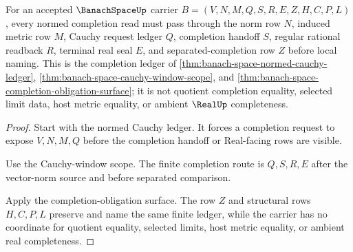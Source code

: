 \begin{theorem}
\label{thm:banach-space-norm-completion-ledger-obligation}
For an accepted $\BanachSpaceUp$ carrier $B=(V,N,M,Q,S,R,E,Z,H,C,P,L)$, every normed completion read must pass through the norm row $N$, induced metric row $M$, Cauchy request ledger $Q$, completion handoff $S$, regular rational readback $R$, terminal real seal $E$, and separated-completion row $Z$ before local naming. This is the completion ledger of \autoref{thm:banach-space-normed-cauchy-ledger}, \autoref{thm:banach-space-cauchy-window-scope}, and \autoref{thm:banach-space-completion-obligation-surface}; it is not quotient completion equality, selected limit data, host metric equality, or ambient $\RealUp$ completeness.
\end{theorem}
\begin{proof}
Start with the normed Cauchy ledger. It forces a completion request to expose $V,N,M,Q$ before the completion handoff or Real-facing rows are visible.

Use the Cauchy-window scope. The finite completion route is $Q,S,R,E$ after the vector-norm source and before separated comparison.

Apply the completion-obligation surface. The row $Z$ and structural rows $H,C,P,L$ preserve and name the same finite ledger, while the carrier has no coordinate for quotient equality, selected limits, host metric equality, or ambient real completeness.
\end{proof}

